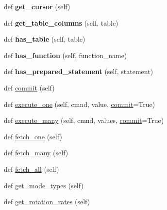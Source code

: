 \begin{DoxyCompactItemize}
def {\bfseries get\+\_\+cursor} (self)
\item 
\mbox{\label{classasamba_1_1db__def_1_1grid__db_ac2716d439ddf4f47cbfd28fb8a1d9f64}} 
def {\bfseries get\+\_\+table\+\_\+columns} (self, table)
\item 
\mbox{\label{classasamba_1_1db__def_1_1grid__db_a9fa0e10ef1c694ce6787ee9f5e8180fc}} 
def {\bfseries has\+\_\+table} (self, table)
\item 
\mbox{\label{classasamba_1_1db__def_1_1grid__db_ae1eeb52929dd95405ed2cdd1fa7e4e34}} 
def {\bfseries has\+\_\+function} (self, function\+\_\+name)
\item 
\mbox{\label{classasamba_1_1db__def_1_1grid__db_a94bbd02b0b7cc0454158f787c0ab3e8d}} 
def {\bfseries has\+\_\+prepared\+\_\+statement} (self, statement)
\item 
def \hyperlink{classasamba_1_1db__def_1_1grid__db_ab9bebf7f7c59d58113210aa514e20000}{commit} (self)
\item 
def \hyperlink{classasamba_1_1db__def_1_1grid__db_a818c15b631b12709a243334f8757066c}{execute\+\_\+one} (self, cmnd, value, \hyperlink{classasamba_1_1db__def_1_1grid__db_ab9bebf7f7c59d58113210aa514e20000}{commit}=True)
\item 
def \hyperlink{classasamba_1_1db__def_1_1grid__db_af8c4c50b39e4fb32a27e4f696240d806}{execute\+\_\+many} (self, cmnd, values, \hyperlink{classasamba_1_1db__def_1_1grid__db_ab9bebf7f7c59d58113210aa514e20000}{commit}=True)
\item 
def \hyperlink{classasamba_1_1db__def_1_1grid__db_a09c07f75a90b670fef71c6aacdca30a2}{fetch\+\_\+one} (self)
\item 
def \hyperlink{classasamba_1_1db__def_1_1grid__db_abd1922057f7741ee343b59cb9d948ffb}{fetch\+\_\+many} (self)
\item 
def \hyperlink{classasamba_1_1db__def_1_1grid__db_aff28a89e835e0a22e3a7c2593a165179}{fetch\+\_\+all} (self)
\item 
def \hyperlink{classasamba_1_1db__def_1_1grid__db_a636c6c1f259ea69934184876f9faa9ea}{get\+\_\+mode\+\_\+types} (self)
\item 
def \hyperlink{classasamba_1_1db__def_1_1grid__db_a27c84439882e562a5e7b53c39d43383f}{get\+\_\+rotation\+\_\+rates} (self)
\end{DoxyCompactItemize}
